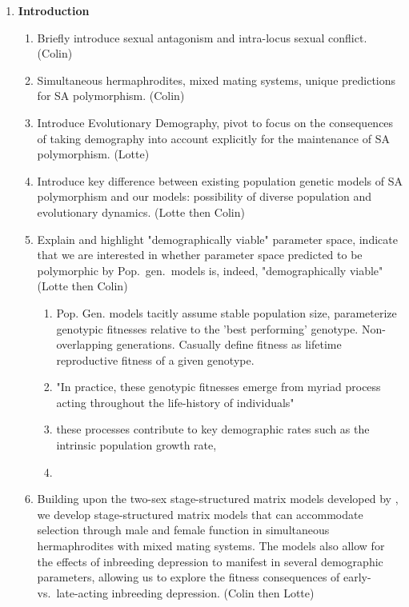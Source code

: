 \documentclass[11pt]{article}
\begin{document}
\begin{enumerate}
	\item {\bf Introduction}
	\begin{enumerate}
		\item Briefly introduce sexual antagonism and intra-locus sexual conflict. (Colin)
		\item Simultaneous hermaphrodites, mixed mating systems, unique predictions for SA polymorphism. (Colin)
		\item Introduce Evolutionary Demography, pivot to focus on the consequences of taking demography into account explicitly for the maintenance of SA polymorphism. (Lotte)
		\item Introduce key difference between existing population genetic models of SA polymorphism and our models: possibility of diverse population and evolutionary dynamics. (Lotte then Colin)
		\item Explain and highlight "demographically viable" parameter space, indicate that we are interested in whether parameter space predicted to be polymorphic by Pop.~gen.~models is, indeed, "demographically viable" (Lotte then Colin)
		\begin{enumerate}
			\item Pop. Gen. models tacitly assume stable population size, parameterize genotypic fitnesses relative to the 'best performing' genotype. Non-overlapping generations. Casually define fitness as lifetime reproductive fitness of a given genotype.
			\item "In practice, these genotypic fitnesses emerge from myriad process acting throughout the life-history of individuals"
			\item these processes contribute to key demographic rates such as the intrinsic population growth rate, 
			\item 
		\end{enumerate}
		\item Building upon the two-sex stage-structured matrix models developed by \citet{deVriesCaswell2019a,deVriesCaswell2019b}, we develop stage-structured matrix models that can accommodate selection through male and female function in simultaneous hermaphrodites with mixed mating systems. The models also allow for the effects of inbreeding depression to manifest in several demographic parameters, allowing us to explore the fitness consequences of early- vs.~late-acting inbreeding depression. (Colin then Lotte)
	\end{enumerate}


\end{enumerate}
\end{document}
